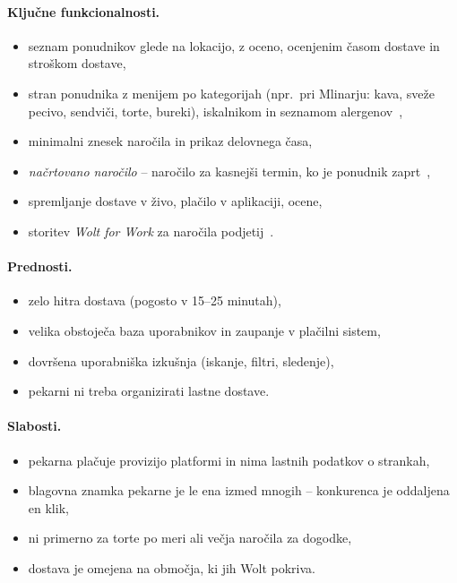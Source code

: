 \documentclass[11pt,a4paper]{article}
\begin{document}
\paragraph{Ključne funkcionalnosti.}
\begin{itemize}
  \item seznam ponudnikov glede na lokacijo, z oceno, ocenjenim časom dostave
        in stroškom dostave,
  \item stran ponudnika z menijem po kategorijah (npr.\ pri Mlinarju: kava,
        sveže pecivo, sendviči, torte, bureki), iskalnikom in seznamom
        alergenov~\cite{wolt-mlinar},
  \item minimalni znesek naročila in prikaz delovnega časa,
  \item \emph{načrtovano naročilo} -- naročilo za kasnejši termin, ko je
        ponudnik zaprt~\cite{wolt-mlinar-brand},
  \item spremljanje dostave v živo, plačilo v aplikaciji, ocene,
  \item storitev \emph{Wolt for Work} za naročila podjetij~\cite{wolt-storitve}.
\end{itemize}

\paragraph{Prednosti.}
\begin{itemize}
  \item zelo hitra dostava (pogosto v 15--25 minutah),
  \item velika obstoječa baza uporabnikov in zaupanje v plačilni sistem,
  \item dovršena uporabniška izkušnja (iskanje, filtri, sledenje),
  \item pekarni ni treba organizirati lastne dostave.
\end{itemize}

\paragraph{Slabosti.}
\begin{itemize}
  \item pekarna plačuje provizijo platformi in nima lastnih podatkov o strankah,
  \item blagovna znamka pekarne je le ena izmed mnogih -- konkurenca je
        oddaljena en klik,
  \item ni primerno za torte po meri ali večja naročila za dogodke,
  \item dostava je omejena na območja, ki jih Wolt pokriva.
\end{itemize}
\end{document}
